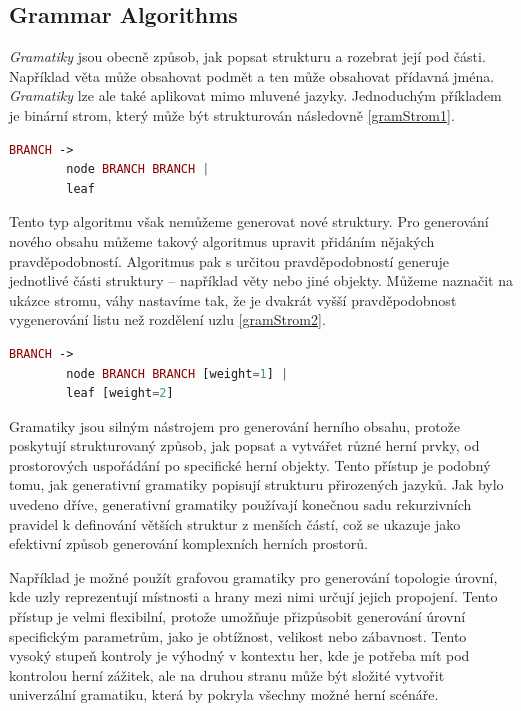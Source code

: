 \subsection{Grammar Algorithms}

\textit{Gramatiky} jsou obecně způsob, jak popsat strukturu a rozebrat její pod části. Například věta může obsahovat podmět a ten může obsahovat přídavná jména. \textit{Gramatiky} lze ale také aplikovat mimo mluvené jazyky. Jednoduchým příkladem je binární strom, který může být strukturován následovně \vref{gramStrom1}. \cite{GramFand} \cite{GramClanek}
\begin{lstlisting}[language=php, caption=Příklad gramatiky: Strom, label=gramStrom1]
    BRANCH ->
        node BRANCH BRANCH |
        leaf
\end{lstlisting}
Tento typ algoritmu však nemůžeme generovat nové struktury. Pro generování nového obsahu můžeme takový algoritmus upravit přidáním nějakých pravděpodobností. Algoritmus pak s určitou pravděpodobností generuje jednotlivé části struktury – například věty nebo jiné objekty. Můžeme naznačit na ukázce stromu, váhy nastavíme tak, že je dvakrát vyšší pravděpodobnost vygenerování listu než rozdělení uzlu \vref{gramStrom2}. \cite{GramClanek}
\begin{lstlisting}[language=php, caption=Příklad gramatiky: Strom s váhami, label=gramStrom2]
    BRANCH ->
        node BRANCH BRANCH [weight=1] |
        leaf [weight=2]
\end{lstlisting}

Gramatiky jsou silným nástrojem pro generování herního obsahu, protože poskytují strukturovaný způsob, jak popsat a vytvářet různé herní prvky, od prostorových uspořádání po specifické herní objekty. Tento přístup je podobný tomu, jak generativní gramatiky popisují strukturu přirozených jazyků. Jak bylo uvedeno dříve, generativní gramatiky používají konečnou sadu rekurzivních pravidel k definování větších struktur z menších částí, což se ukazuje jako efektivní způsob generování komplexních herních prostorů.

Například je možné použít grafovou gramatiky pro generování topologie úrovní, kde uzly reprezentují místnosti a hrany mezi nimi určují jejich propojení. Tento přístup je velmi flexibilní, protože umožňuje přizpůsobit generování úrovní specifickým parametrům, jako je obtížnost, velikost nebo zábavnost. Tento vysoký stupeň kontroly je výhodný v kontextu her, kde je potřeba mít pod kontrolou herní zážitek, ale na druhou stranu může být složité vytvořit univerzální gramatiku, která by pokryla všechny možné herní scénáře.

